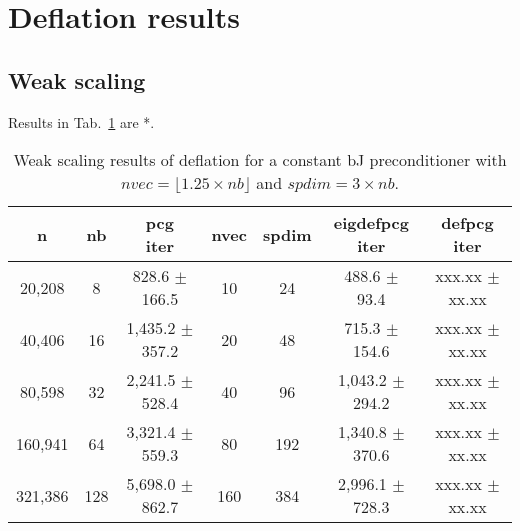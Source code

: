 \documentclass{article}
\begin{document}
\section{Deflation results}

\subsection{Weak scaling}
Results in Tab.~\ref{Tab:005} are *.





\begin{table}[ht]
	\caption{Weak scaling results of deflation for a constant bJ preconditioner with $nvec=\lfloor1.25\times nb\rfloor$ and $spdim=3\times nb$.}
	\centering
	\begin{tabular}{|c|c|c|c|c|c|c|}
		\hline
		n & nb & \makecell{pcg\\ iter} & nvec & spdim & \makecell{eigdefpcg\\ iter} & \makecell{defpcg\\ iter}\\
		\hline
		20,208  &   8 &   828.6 $\pm$ 166.5 &  10 &  24 &   488.6 $\pm$  93.4 & xxx.xx $\pm$ xx.xx \\
		40,406  &  16 & 1,435.2 $\pm$ 357.2 &  20 &  48 &   715.3 $\pm$ 154.6 & xxx.xx $\pm$ xx.xx \\
		80,598  &  32 & 2,241.5 $\pm$ 528.4 &  40 &  96 & 1,043.2 $\pm$ 294.2 & xxx.xx $\pm$ xx.xx \\
		160,941 &  64 & 3,321.4 $\pm$ 559.3 &  80 & 192 & 1,340.8 $\pm$ 370.6 & xxx.xx $\pm$ xx.xx \\
		321,386 & 128 & 5,698.0 $\pm$ 862.7 & 160 & 384 & 2,996.1 $\pm$ 728.3 & xxx.xx $\pm$ xx.xx \\
		\hline
	\end{tabular}
	\label{Tab:005}
\end{table}
\end{document}
